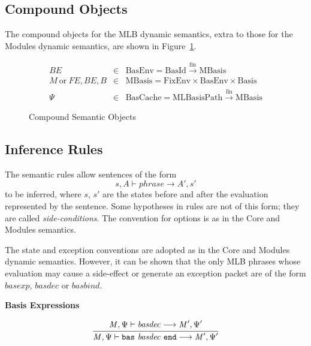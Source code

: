 \documentclass[draft]{article}
\renewcommand{\mit}[1]{\mathit{#1}}
\newcommand{\mrm}[1]{\mathrm{#1}}
\newcommand{\mtt}[1]{\mathtt{#1}}
\newcommand{\infrule}[2]{{\frac{\displaystyle\strut{#1}}{\displaystyle\strut{#2}}}}
\newcommand{\judge}[2]{\infrule{#1}{#2}}
\begin{document}
\subsection{Compound Objects}
The compound objects for the MLB dynamic semantics, extra to those
for the Modules dynamic semantics, are shown in Figure~\ref{fig:mlb:DS:CompoundObjects}.
\begin{figure}[h]
\begin{displaymath}
\begin{array}{rcl}
\mit{BE} & \in & \mrm{BasEnv} = \mrm{BasId} \xrightarrow{\mrm{fin}} \mrm{MBasis} \\
\mit{M} ~\mrm{or}~ \mit{FE},\mit{BE},\mit{B} & \in & \mrm{MBasis} =
\mrm{FixEnv} \times \mrm{BasEnv} \times \mrm{Basis} \\
\Psi & \in & \mrm{BasCache} = \mrm{MLBasisPath} \xrightarrow{\mrm{fin}} \mrm{MBasis} 
\end{array}
\end{displaymath}
\caption{Compound Semantic Objects}\label{fig:mlb:DS:CompoundObjects}
\end{figure}
%
\subsection{Inference Rules}
The semantic rules allow sentences of the form
\begin{displaymath}
s, A \vdash \mit{phrase} \longrightarrow A', s'
\end{displaymath}
to be inferred, where $s$, $s'$ are the states before and after the
evaluation represented by the sentence.  Some hypotheses in rules are
not of this form; they are called \emph{side-conditions}. The
convention for options is as in the Core and Modules semantics.

The state and exception conventions are adopted as in the Core and
Modules dynamic semantics.  However, it can be shown that the only
MLB phrases whose evaluation may cause a side-effect or generate an
exception packet are of the form $\mit{basexp}$, $\mit{basdec}$ or
$\mit{basbind}$.

\vspace{2\parsep}
{\large\noindent
\textbf{Basis Expressions} \hfill 
\fbox{$\mit{M}, \Psi \vdash \mit{basexp} \longrightarrow \mit{M}', \Psi' / p$}
}\nopagebreak

\begin{equation}
\judge{
\mit{M}, \Psi \vdash \mit{basdec} \longrightarrow \mit{M}', \Psi'
}{
\mit{M}, \Psi \vdash \mtt{bas}~ \mit{basdec} ~\mtt{end} \longrightarrow \mit{M}', \Psi'
}
\end{equation}
\end{document}
